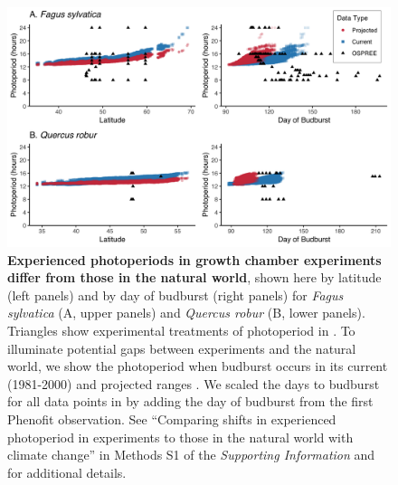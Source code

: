 \documentclass{article}
\begin{document}
\begin{figure}[h]
\includegraphics{..//..//analyses/photoperiod/figures/2D_actual_combined.png} 
\caption{\textbf{Experienced photoperiods in growth chamber experiments differ from those in the natural world}, shown here by latitude (left panels) and by day of budburst (right panels) for \emph{Fagus sylvatica} (A, upper panels) and \emph{Quercus robur} (B, lower panels). Triangles show experimental treatments of photoperiod in \citet{wolkovich2019}. To illuminate potential gaps between experiments and the natural world, we show the photoperiod when budburst occurs in its current (1981-2000) and projected ranges \citep[2081-2100, using the A1Fi Phenofit scenario, see][]{duputie2015}. We scaled the days to budburst for all data points in \citet{wolkovich2019} by adding the day of budburst from the first Phenofit observation. See ``Comparing shifts in experienced photoperiod in experiments to those in the natural world with climate change'' in Methods S1 of the \emph{Supporting Information} and \citet{duputie2015} for additional details.} 
 \label{fig:fagus}
 \end{figure}
 
\clearpage 
\end{document}
